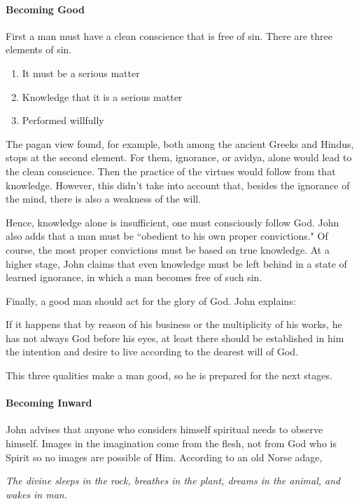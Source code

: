\paragraph{Becoming Good}
First a man must have a clean conscience that is free of sin. There are three elements of sin.

\begin{enumerate}
\item It must be a serious matter 
\item Knowledge that it is a serious matter 
\item Performed willfully 
\end{enumerate}
The pagan view found, for example, both among the ancient Greeks and Hindus, stops at the second element. For them, ignorance, or avidya, alone would lead to the clean conscience. Then the practice of the virtues would follow from that knowledge. However, this didn't take into account that, besides the ignorance of the mind, there is also a weakness of the will.

Hence, knowledge alone is insufficient, one must consciously follow God. John also adds that a man must be ``obedient to his own proper convictions." Of course, the most proper convictions must be based on true knowledge. At a higher stage, John claims that even knowledge must be left behind in a state of learned ignorance, in which a man becomes free of such sin.

Finally, a good man should act for the glory of God. John explains:

\begin{quotex}
If it happens that by reason of his business or the multiplicity of his works, he has not always God before his eyes, at least there should be established in him the intention and desire to live according to the dearest will of God. 

\end{quotex}
This three qualities make a man good, so he is prepared for the next stages.

\paragraph{Becoming Inward}
John advises that anyone who considers himself spiritual needs to observe himself. Images in the imagination come from the flesh, not from God who is Spirit so no images are possible of Him. According to an old Norse adage,

\emph{The divine sleeps in the rock, breathes in the plant, dreams in the animal, and wakes in man.}

